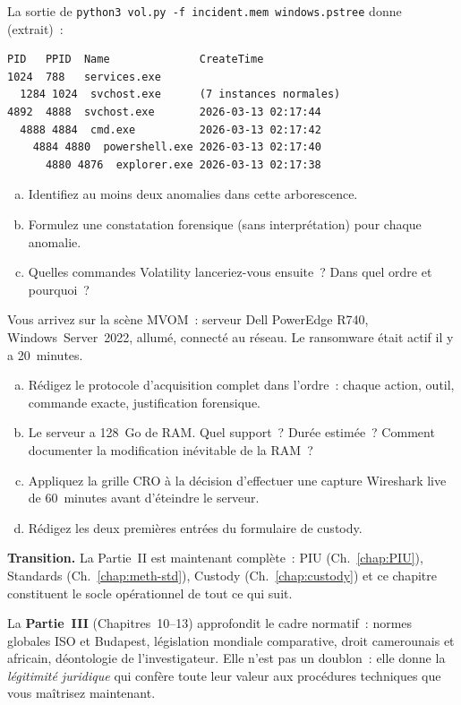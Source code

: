 \begin{boxexo}[title={\ding{45}\quad Exercice~9.2. Analyse Volatility \niveaumoyen}]
La sortie de \texttt{python3 vol.py -f incident.mem windows.pstree}
donne (extrait)~:
\begin{lstlisting}[language=bash_forensique]
PID   PPID  Name              CreateTime
1024  788   services.exe
  1284 1024  svchost.exe      (7 instances normales)
4892  4888  svchost.exe       2026-03-13 02:17:44
  4888 4884  cmd.exe          2026-03-13 02:17:42
    4884 4880  powershell.exe 2026-03-13 02:17:40
      4880 4876  explorer.exe 2026-03-13 02:17:38
\end{lstlisting}
\begin{enumerate}[(a)]
    \item Identifiez au moins deux anomalies dans cette arborescence.
    \item Formulez une constatation forensique (sans interprétation)
          pour chaque anomalie.
    \item Quelles commandes Volatility lanceriez-vous ensuite~?
          Dans quel ordre et pourquoi~?
\end{enumerate}
\end{boxexo}

\begin{boxexo}[title={\ding{45}\quad Exercice~9.3. Pipeline complet \niveauexpert}]
Vous arrivez sur la scène MVOM~: serveur Dell PowerEdge R740,
Windows~Server~2022, allumé, connecté au réseau. Le ransomware était
actif il y a 20~minutes.
\begin{enumerate}[(a)]
    \item Rédigez le protocole d'acquisition complet dans l'ordre~:
          chaque action, outil, commande exacte, justification forensique.
    \item Le serveur a 128~Go de RAM. Quel support~? Durée estimée~?
          Comment documenter la modification inévitable de la RAM~?
    \item Appliquez la grille CRO à la décision d'effectuer une capture
          Wireshark live de 60~minutes avant d'éteindre le serveur.
    \item Rédigez les deux premières entrées du formulaire de custody.
\end{enumerate}
\end{boxexo}

\bigskip

\begin{boxinfo}
\textbf{Transition.} La Partie~II est maintenant complète~: PIU
(Ch.~\ref{chap:PIU}), Standards (Ch.~\ref{chap:meth-std}),
Custody (Ch.~\ref{chap:custody}) et ce chapitre constituent
le socle opérationnel de tout ce qui suit.

La \textbf{Partie~III} (Chapitres~10--13) approfondit le cadre normatif~:
normes globales ISO et Budapest, législation mondiale comparative,
droit camerounais et africain, déontologie de l'investigateur. Elle
n'est pas un doublon~: elle donne la \emph{légitimité juridique} qui
confère toute leur valeur aux procédures techniques que vous maîtrisez
maintenant.
\end{boxinfo}
